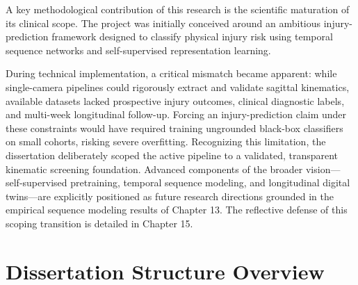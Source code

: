 A key methodological contribution of this research is the scientific maturation of its clinical scope. The project was initially conceived around an ambitious injury-prediction framework designed to classify physical injury risk using temporal sequence networks and self-supervised representation learning.

During technical implementation, a critical mismatch became apparent: while single-camera pipelines could rigorously extract and validate sagittal kinematics, available datasets lacked prospective injury outcomes, clinical diagnostic labels, and multi-week longitudinal follow-up. Forcing an injury-prediction claim under these constraints would have required training ungrounded black-box classifiers on small cohorts, risking severe overfitting. Recognizing this limitation, the dissertation deliberately scoped the active pipeline to a validated, transparent kinematic screening foundation. Advanced components of the broader vision—self-supervised pretraining, temporal sequence modeling, and longitudinal digital twins—are explicitly positioned as future research directions grounded in the empirical sequence modeling results of Chapter 13. The reflective defense of this scoping transition is detailed in Chapter 15.



\section{Dissertation Structure Overview}
\label{sec:1-5-dissertation-structure-overview}


